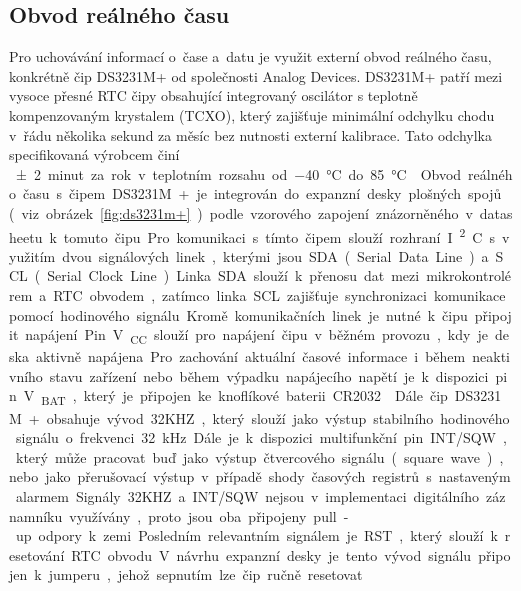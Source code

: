 \newpage

\subsection{Obvod reálného času}
Pro uchovávání informací o~čase a~datu je využit externí obvod reálného času, konkrétně čip DS3231M+ od společnosti Analog Devices. DS3231M+ patří mezi vysoce přesné RTC čipy obsahující integrovaný oscilátor s teplotně kompenzovaným krystalem (TCXO), který zajišťuje minimální odchylku chodu v~řádu několika sekund za měsíc bez nutnosti externí kalibrace. Tato odchylka specifikovaná výrobcem činí \SI{\pm2} minut za rok v~teplotním rozsahu od \SI{-40}{\degreeCelsius} do \SI{+85}{\degreeCelsius}.~\cite{DS3231_manual}

Obvod reálného času s čipem DS3231M+ je integrován do expanzní desky plošných spojů (viz. obrázek~\ref{fig:ds3231m+}) podle vzorového zapojení znázorněného v~datasheetu k~tomuto čipu. Pro komunikaci s tímto čipem slouží rozhraní I\textsuperscript{2}C s využitím dvou signálových linek, kterými jsou SDA (Serial Data Line) a~SCL (Serial Clock Line). Linka SDA slouží k~přenosu dat mezi mikrokontrolérem a~RTC obvodem, zatímco linka SCL zajišťuje synchronizaci komunikace pomocí hodinového signálu. Kromě komunikačních linek je nutné k~čipu připojit napájení. Pin V\textsubscript{CC} slouží pro napájení čipu v~běžném provozu, kdy je deska aktivně napájena. Pro zachování aktuální časové informace i~během neaktivního stavu zařízení nebo během výpadku napájecího napětí je k~dispozici pin V\textsubscript{BAT}, který je připojen ke knoflíkové baterii CR2032.~\cite{DS3231_manual}

Dále čip DS3231M+ obsahuje vývod 32KHZ, který slouží jako výstup stabilního hodinového signálu o~frekvenci 32 kHz. Dále je k~dispozici multifunkční pin INT/SQW, který může pracovat buď jako výstup čtvercového signálu (square wave), nebo jako přerušovací výstup v~případě shody časových registrů s nastaveným alarmem. Signály 32KHZ a~INT/SQW nejsou v~implementaci digitálního záznamníku využívány, proto jsou oba připojeny pull-up odpory k~zemi. Posledním relevantním signálem je RST, který slouží k~resetování RTC obvodu. V~návrhu expanzní desky je tento vývod signálu připojen k~jumperu, jehož sepnutím lze čip ručně resetovat.~\cite{DS3231_manual}

